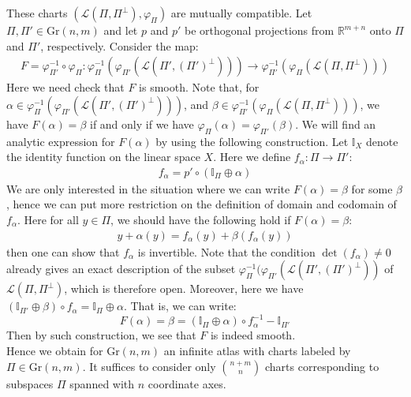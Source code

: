 \documentclass[11pt]{book}
\theoremstyle{break}
\theoremstyle{break}
\newcommand{\R}{\mathbb{R}}
\begin{document}
These charts $(\mathcal{L}(\Pi, \Pi^{\perp}), \varphi_{\Pi})$  are mutually compatible. Let $\Pi, \Pi' \in \text{Gr}(n,m)$ and let $p$ and $p'$ be orthogonal projections from $\R^{m+n}$ onto $\Pi$ and $\Pi'$, respectively. Consider the map:
\begin{align*}
F = \varphi_{\Pi'}^{-1}\circ \varphi_{\Pi} : \varphi_{\Pi}^{-1}\left( \varphi_{\Pi'}\left( \mathcal{L}\left(\Pi', \left(\Pi'\right)^{\perp}\right)\right)\right) \to \varphi_{\Pi'}^{-1}\left( \varphi_{\Pi}\left(\mathcal{L}\left(\Pi, \Pi^{\perp}\right) \right)\right)
\end{align*}
Here we need check that $F$ is smooth. Note that, for $\alpha \in \varphi_{\Pi}^{-1}( \varphi_{\Pi'}( \mathcal{L}(\Pi', (\Pi')^{\perp})))$, and $\beta \in \varphi_{\Pi'}^{-1}( \varphi_{\Pi}(\mathcal{L}(\Pi, \Pi^{\perp}) ))$, we have $F(\alpha) = \beta$ if and only if we have $\varphi_{\Pi}(\alpha) = \varphi_{\Pi'}(\beta)$. We will find an analytic expression for $F(\alpha)$ by using the following construction. Let $\mathbb{I}_{X}$ denote the identity function on the linear space $X$. Here we define $f_\alpha : \Pi \to \Pi'$:
\begin{align*}
f_\alpha = p'\circ \left(\mathbb{I}_{\Pi} \oplus \alpha\right)
\end{align*}
We are only interested in the situation where we can write $F(\alpha) = \beta$ for some $\beta$, hence we can put more restriction on the definition of domain and codomain of $f_\alpha$. Here for all $y \in \Pi$, we should have the following hold if $F(\alpha) = \beta$:
\begin{align*}
y+\alpha(y) = f_\alpha (y) + \beta (f_\alpha(y))
\end{align*}
then one can show that $f_\alpha$ is invertible. Note that the condition $\det(f_\alpha) \neq 0$ already gives an exact description of the subset $\varphi_{\Pi}^{-1}(\varphi_{\Pi'}(\mathcal{L}(\Pi', (\Pi')^{\perp}))$ of $\mathcal{L}(\Pi, \Pi^{\perp})$, which is therefore open. Moreover, here we have $(\mathbb{I}_{\Pi'}\oplus \beta)\circ f_\alpha = \mathbb{I}_{\Pi}\oplus \alpha$. That is, we can write:
$$F(\alpha) = \beta = (\mathbb{I}_{\Pi}\oplus \alpha) \circ f_\alpha^{-1} - \mathbb{I}_{\Pi'}$$ Then by such construction, we see that $F$ is indeed smooth.\\

Hence we obtain for $\text{Gr}(n,m)$ an infinite atlas with charts labeled by $\Pi\in \text{Gr}(n,m)$. It suffices to consider only $\binom{n+m}{n}$ charts corresponding to subspaces $\Pi$ spanned with $n$ coordinate axes. \\
\end{document}
